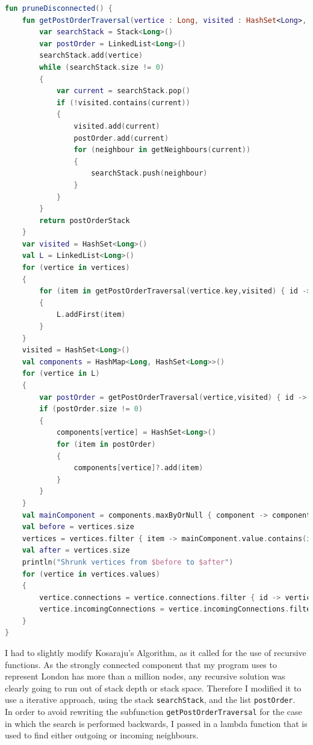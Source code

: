\documentclass[11pt,twoside,a4paper]{article}
\begin{document}
\begin{lstlisting}[language=kotlin]
fun pruneDisconnected() {
    fun getPostOrderTraversal(vertice : Long, visited : HashSet<Long>, getNeighbours : (Long) -> HashSet<Long>): List<Long> {
        var searchStack = Stack<Long>()
        var postOrder = LinkedList<Long>()
        searchStack.add(vertice)
        while (searchStack.size != 0)
        {
            var current = searchStack.pop()
            if (!visited.contains(current))
            {
                visited.add(current)
                postOrder.add(current)
                for (neighbour in getNeighbours(current))
                {
                    searchStack.push(neighbour)
                }
            }
        }
        return postOrderStack
    }
    var visited = HashSet<Long>()
    val L = LinkedList<Long>()
    for (vertice in vertices)
    {
        for (item in getPostOrderTraversal(vertice.key,visited) { id -> vertices[id]!!.connections })
        {
            L.addFirst(item)
        }
    }
    visited = HashSet<Long>()
    val components = HashMap<Long, HashSet<Long>>()
    for (vertice in L)
    {
        var postOrder = getPostOrderTraversal(vertice,visited) { id -> vertices[id]!!.incomingConnections }
        if (postOrder.size != 0)
        {
            components[vertice] = HashSet<Long>()
            for (item in postOrder)
            {
                components[vertice]?.add(item)
            }
        }
    }
    val mainComponent = components.maxByOrNull { component -> component.value.size }!!
    val before = vertices.size
    vertices = vertices.filter { item -> mainComponent.value.contains(item.key) } as HashMap<Long, GeographicNode>
    val after = vertices.size
    println("Shrunk vertices from $before to $after")
    for (vertice in vertices.values)
    {
        vertice.connections = vertice.connections.filter { id -> vertices.containsKey(id) }.toHashSet()
        vertice.incomingConnections = vertice.incomingConnections.filter { id -> vertices.containsKey(id)}.toHashSet()
    }
}
\end{lstlisting}
I had to slightly modify Kosaraju's Algorithm\cite{wikipedia_2022}, as it called for the use of recursive functions. As the strongly connected component that my program uses to represent London has more than a million nodes, any recursive
solution was clearly going to run out of stack depth or stack space. Therefore I modified it to use a iterative approach, using the stack \texttt{searchStack}, and the list \texttt{postOrder}.\\ In order to avoid rewriting the subfunction \texttt{getPostOrderTraversal} for the case in which the search is performed backwards, I passed in a lambda function that is used to find either outgoing or incoming neighbours. 
\end{document}
